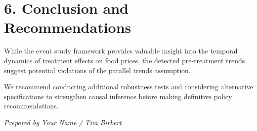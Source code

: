 \documentclass[a4paper,12pt]{article}
\begin{document}
\section*{6. Conclusion and Recommendations}

While the event study framework provides valuable insight into the temporal dynamics of treatment effects on food prices, the detected pre-treatment trends suggest potential violations of the parallel trends assumption.

We recommend conducting additional robustness tests and considering alternative specifications to strengthen causal inference before making definitive policy recommendations.

\vspace{2em}

\noindent\textit{Prepared by Your Name / Tim Birkert}
\end{document}
